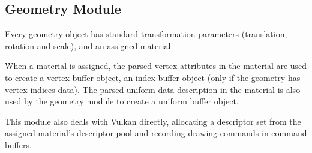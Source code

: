 \subsection{Geometry Module}
Every geometry object has standard transformation parameters (translation,
rotation and scale), and an assigned material.

When a material is assigned, the parsed vertex attributes in the material are
used to create a vertex buffer object, an index buffer object (only if the
geometry has vertex indices data). The parsed uniform data description in the
material is also used by the geometry module to create a uniform buffer object.

This module also deals with Vulkan directly, allocating a descriptor set from
the assigned material's descriptor pool and recording drawing commands in
command buffers.
